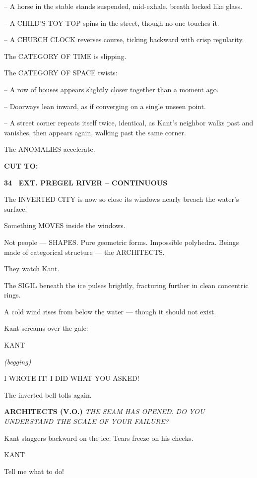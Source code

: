 \documentclass[12pt]{article}
\newcommand{\scene}[2]{%
  \vspace{1.8\baselineskip}%
  \noindent\textbf{#1 \ #2}\par\vspace{0.4\baselineskip}%
}
\newenvironment{dialogue}[1]{%
  \vspace{0.8\baselineskip}%
  \noindent\hspace*{2.3in}\textsc{#1}\par%
  \noindent\hspace*{1.5in}\begin{minipage}[t]{4.5in}%
}{%
  \end{minipage}\par%
}
\newcommand{\paren}[1]{%
  \noindent\hspace*{1.8in}\textit{(#1)}\par%
}
\newcommand{\transition}[1]{%
  \vspace{0.6\baselineskip}%
  \begin{flushright}\textbf{#1}\end{flushright}%
}
\begin{document}
-- A horse in the stable stands suspended, mid-exhale, breath locked
like glass.

-- A CHILD’S TOY TOP spins in the street, though no one touches it.

-- A CHURCH CLOCK reverses course, ticking backward with crisp
regularity.

The CATEGORY OF TIME is slipping.

The CATEGORY OF SPACE twists:

-- A row of houses appears slightly closer together than a moment ago.

-- Doorways lean inward, as if converging on a single unseen point.

-- A street corner repeats itself twice, identical, as Kant’s neighbor
walks past and vanishes, then appears again, walking past the same
corner.

The ANOMALIES accelerate.

\transition{CUT TO:}


\scene{34}{EXT. PREGEL RIVER – CONTINUOUS}

The INVERTED CITY is now so close its windows nearly breach the water’s
surface.

Something MOVES inside the windows.

Not people — SHAPES. Pure geometric forms. Impossible polyhedra.  
Beings made of categorical structure — the ARCHITECTS.

They watch Kant.

The SIGIL beneath the ice pulses brightly, fracturing further in clean
concentric rings.

A cold wind rises from below the water — though it should not exist.

Kant screams over the gale:

\begin{dialogue}{KANT}
\paren{begging}
I WROTE IT! I DID WHAT YOU ASKED!
\end{dialogue}

The inverted bell tolls again.

\textbf{ARCHITECTS (V.O.)}  
\emph{THE SEAM HAS OPENED.}  
\emph{DO YOU UNDERSTAND THE SCALE OF YOUR FAILURE?}

Kant staggers backward on the ice. Tears freeze on his cheeks.

\begin{dialogue}{KANT}
Tell me what to do!
\end{dialogue}
\end{document}
